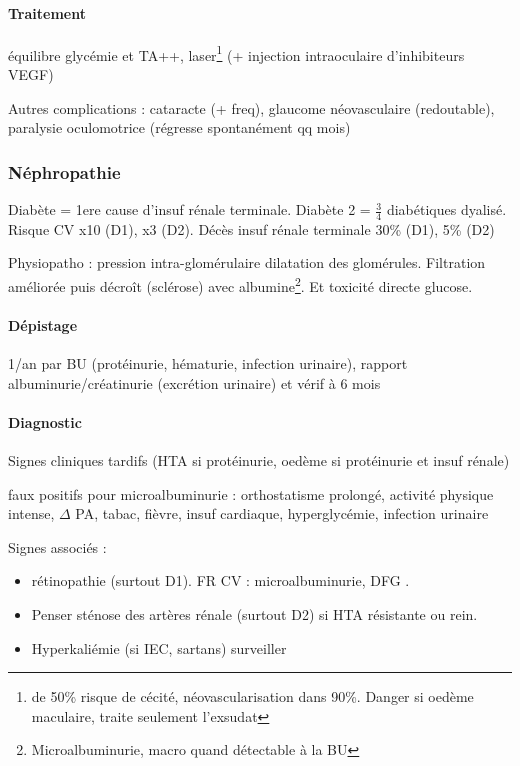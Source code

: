 \documentclass[11pt]{article}
\begin{document}
\paragraph{Traitement}
\label{sec:org1497310}
équilibre glycémie et TA++, laser\footnote{\dec de 50\% risque de cécité, \dec néovascularisation dans 90\%. Danger
si oedème maculaire, traite seulement l'exsudat} (+ injection intraoculaire
d'inhibiteurs VEGF)

Autres complications : cataracte (+ freq), glaucome néovasculaire (redoutable),
paralysie oculomotrice (régresse spontanément qq mois)

\subsubsection{Néphropathie}
\label{sec:org5aaa1c2}
Diabète = 1ere cause d'insuf rénale terminale. Diabète 2 = \(\frac{3}{4}\)
diabétiques dyalisé. Risque CV x10 (D1), x3 (D2). Décès insuf rénale terminale
30\% (D1), 5\% (D2)

Physiopatho : \inc pression intra-glomérulaire \thus dilatation des
glomérules. Filtration améliorée puis décroît (sclérose) avec \inc
albumine\footnote{Microalbuminurie, macro quand détectable à la BU}. Et toxicité directe glucose.

\paragraph{Dépistage}
\label{sec:orgc674695}
1/an par BU (protéinurie, hématurie, infection urinaire),
rapport albuminurie/créatinurie (excrétion urinaire) et vérif à 6 mois

\paragraph{Diagnostic}
\label{sec:orgd302b96}
Signes cliniques tardifs (HTA si protéinurie, oedème si protéinurie et insuf
rénale)

\danger{} faux positifs pour microalbuminurie : orthostatisme prolongé, activité
physique intense, \(\Delta\) PA, tabac, fièvre, \inc insuf cardiaque, hyperglycémie,
infection urinaire

Signes associés : 
\begin{itemize}
\item rétinopathie (surtout D1). FR CV : microalbuminurie, DFG \dec.
\item Penser sténose des artères rénale (surtout D2) si HTA résistante ou \dec\dec
rein.
\item Hyperkaliémie (\inc si IEC, sartans) \thus surveiller
\end{itemize}
\end{document}
